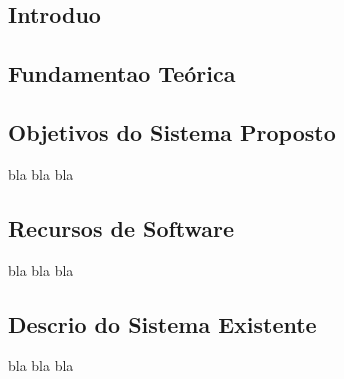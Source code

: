 \begin{titlepage}
\chapter{Introdu\ca o}
\section{Fundamenta\ca o Te\'orica}

\section{Objetivos do Sistema Proposto}
bla bla bla
\section{Recursos de Software}
bla bla bla
\section{Descri\ca o do Sistema Existente}
bla bla bla
\end{titlepage}
